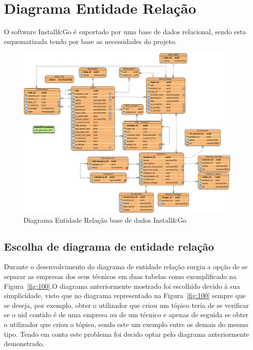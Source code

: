\section{Diagrama Entidade Relação}

O software Install\&Go é suportado por uma base de dados relacional, 
sendo esta esquematizada tendo por base as necessidades do projeto.

\begin{figure}[htb]
    \centering
    
    \includegraphics[width=\textwidth]{images/diagramas/diagrama_bd.png}
    \caption{Diagrama Entidade Relação base de dados Install\&Go}
    \label{fig:20}
\end{figure}

\newpage

\subsection{Escolha de diagrama de entidade relação}
Durante o desenvolvimento do diagrama de entidade relação surgiu 
a opção de se separar as empresas dos seus técnicos em duas tabelas como 
exemplificado na Figura~\ref{fig:100}.O diagrama anteriormente 
mostrado foi escolhido devido à sua simplicidade, 
visto que no diagrama representado na Figura~\ref{fig:100} sempre que se
deseja, por exemplo, obter o utilizador que criou um tópico teria de se
verificar se o uid contido é de uma empresa ou de um técnico e apenas 
de seguida se obter o utilizador que criou o tópico, sendo este um exemplo
entre os demais do mesmo tipo. Tendo em conta este problema foi decido optar
pelo diagrama anteriormente demonstrado.

